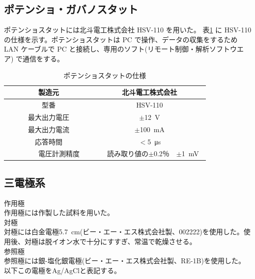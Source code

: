 \subsection{ポテンショ・ガバノスタット}
ポテンショスタットには北斗電工株式会社 HSV-110 を用いた。 表\ref{HSV110仕様} に HSV-110 の仕様を示す。ポテンショスタットは PC で操作、データの収集をするため LAN ケーブルで PC と接続し、専用のソフト(リモート制御・解析ソフトウエア) で通信をする。
\begin{table}[H]
    \centering
    \caption{ポテンショスタットの仕様}
    \label{HSV110仕様}
    \begin{tabular}{cc}
        \hline 
        製造元&北斗電工株式会社\\\hline
        型番&HSV-110\\\hline
        最大出力電圧&$\pm$\SI{12}{V}\\\hline
        最大出力電流&$\pm$\SI{100}{mA}\\\hline
        応答時間&$<$\SI{5}{\micro s}\\\hline
        　　　電圧計測精度　　　&　読み取り値の$\pm$0.2％　$\pm$\SI{1}{mV}　\\\hline
    \end{tabular}    
\end{table}
\subsection{三電極系}
作用極\\
作用極には作製した試料を用いた。\\
\quad  対極\\
対極には白金電極\SIlist{5.7}{\cm}(ビー・エー・エス株式会社製、002222)を使用した。使用後、対極は脱イオン水で十分にすすぎ、常温で乾燥させる。\\
\quad  参照極\\
参照極には銀-塩化銀電極(ビー・エー・エス株式会社製、RE-1B)を使用した。以下この電極をAg/AgClと表記する。
